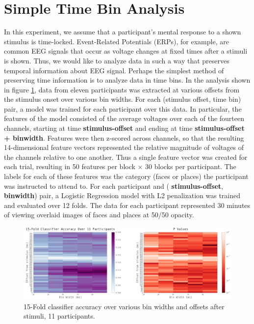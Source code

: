 \documentclass[12pt]{report}
\begin{document}
\section{Simple Time Bin Analysis \label{timebin}}

	In this experiment, we assume that a participant's mental response to a shown stimulus is time-locked.  Event-Related Potentials (ERPs), for example, are common EEG signals that occur as voltage changes at fixed times after a stimuli is shown.  Thus, we would like to analyze data in such a way that preserves temporal information about EEG signal.  Perhaps the simplest method of preserving time information is to analyze data in time bins.  In the analysis shown in figure \ref{nfoldsimple}, data from eleven participants was extracted at various offsets from the stimulus onset over various bin widths.  For each (stimulus offset, time bin) pair, a model was trained for each participant over this data.  In particular, the features of the model consisted of the average voltages over each of the fourteen channels, starting at time \textbf{stimulus-offset} and ending at time \textbf{stimulus-offset + binwidth}.  Features were then z-scored across channels, so that the resulting 14-dimensional feature vectors represented the relative magnitude of voltages of the channels relative to one another.  Thus a single feature vector was created for each trial, resulting in 50 features per block $\times$ 30 blocks per participant.  The labels for each of these features was the category (faces or places) the participant was instructed to attend to. For each participant and (\textbf{ stimulus-offset}, \textbf{binwidth}) pair, a Logistic Regression model with L2 penalization was trained and evaluated over 12 folds.  The data for each participant represented 30 minutes of viewing overlaid images of faces and places at 50/50 opacity.

\begin{figure}[t]
\centerline{
\includegraphics[width=7in]{gridsearch_logreg_simple}
}
\caption{15-Fold classifier accuracy over various bin widths and offsets after stimuli, 11 participants.\label{nfoldsimple}}
\end{figure}
\end{document}
